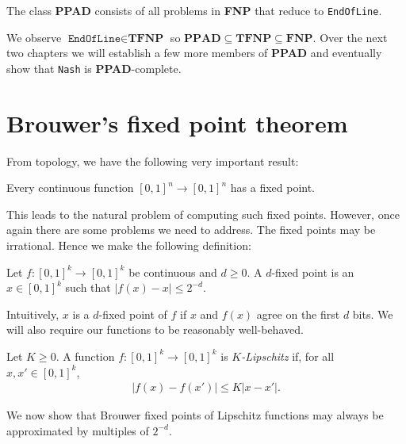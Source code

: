 \documentclass{article}
\begin{document}
\begin{definition}
  The class \textbf{PPAD} consists of all problems in \textbf{FNP}
  that reduce to \texttt{EndOfLine}.
\end{definition}

We observe $\texttt{EndOfLine}\in\textbf{TFNP}$ so
$\textbf{PPAD}\subseteq\textbf{TFNP}\subseteq\textbf{FNP}$.
Over the next two chapters we will establish a few more members
of \textbf{PPAD} and eventually show that \texttt{Nash} is
\textbf{PPAD}-complete.

\section{Brouwer's fixed point theorem}

From topology, we have the following very important result:

\begin{theorem}[Brouwer]
  Every continuous function $[0,1]^n\to[0,1]^n$ has a fixed point.
\end{theorem}

This leads to the natural problem of computing such fixed points.
However, once again there are some problems we need to address.
The fixed points may be irrational. Hence we make the following
definition:

\begin{definition}
  Let $f:\left[{0,1}\right]^k \to \left[{0,1}\right]^k$ be continuous and
  $d\geq 0$. A $d$-fixed point is an $x\in\left[{0,1}\right]^k$ such that
  $|f(x)-x|\leq 2^{-d}$.
\end{definition}

Intuitively, $x$ is a $d$-fixed point of $f$ if $x$ and $f(x)$ agree on the
first $d$ bits. We will also require our functions to be reasonably
well-behaved.

\begin{definition}
  Let $K\geq 0$. A function $f:\left[{0,1}\right]^k\to\left[{0,1}\right]^k$ is \emph{$K$-Lipschitz} if, for all $x,x'\in\left[{0,1}\right]^k$,
  \begin{align*}
    |f(x)-f(x')| \leq K|x-x'|.
  \end{align*}
\end{definition}

We now show that Brouwer fixed points of Lipschitz functions may always be
approximated by multiples of $2^{-d}$.
\end{document}
